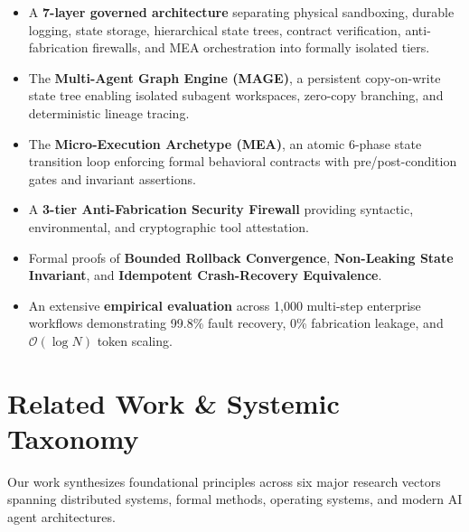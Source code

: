 \documentclass[10pt,journal,compsoc]{IEEEtran}
\begin{document}
\begin{itemize}
    \item A \textbf{7-layer governed architecture} separating physical sandboxing, durable logging, state storage, hierarchical state trees, contract verification, anti-fabrication firewalls, and MEA orchestration into formally isolated tiers.
    \item The \textbf{Multi-Agent Graph Engine (MAGE)}, a persistent copy-on-write state tree enabling isolated subagent workspaces, zero-copy branching, and deterministic lineage tracing.
    \item The \textbf{Micro-Execution Archetype (MEA)}, an atomic 6-phase state transition loop enforcing formal behavioral contracts with pre/post-condition gates and invariant assertions.
    \item A \textbf{3-tier Anti-Fabrication Security Firewall} providing syntactic, environmental, and cryptographic tool attestation.
    \item Formal proofs of \textbf{Bounded Rollback Convergence}, \textbf{Non-Leaking State Invariant}, and \textbf{Idempotent Crash-Recovery Equivalence}.
    \item An extensive \textbf{empirical evaluation} across 1,000 multi-step enterprise workflows demonstrating 99.8\% fault recovery, 0\% fabrication leakage, and $\mathcal{O}(\log N)$ token scaling.
\end{itemize}

\section{Related Work \& Systemic Taxonomy}
Our work synthesizes foundational principles across six major research vectors spanning distributed systems, formal methods, operating systems, and modern AI agent architectures.
\end{document}
